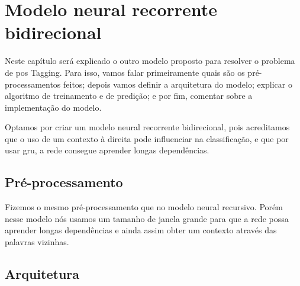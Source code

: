 










\chapter{Modelo neural recorrente bidirecional}\label{modeloneuralrecorrentebidir}

Neste capítulo será explicado o outro modelo proposto para resolver o problema de \ac{pos} Tagging. Para isso, vamos falar primeiramente quais são os pré-processamentos feitos; depois vamos definir a arquitetura do modelo; explicar o algoritmo de treinamento e de predição; e por fim, comentar sobre a implementação do modelo.

Optamos por criar um modelo neural recorrente bidirecional, pois acreditamos que o uso de um contexto à direita pode influenciar na classificação, e que por usar \ac{gru}, a rede consegue aprender longas dependências.



\section{Pré-processamento}

Fizemos o mesmo pré-processamento que no modelo neural recursivo. Porém nesse modelo nós usamos um tamanho de janela grande para que a rede possa aprender longas dependências e ainda assim obter um contexto através das palavras vizinhas.


\section{Arquitetura}


